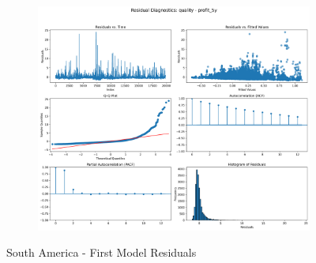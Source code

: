 \documentclass[11pt,english,a4paper,hidelinks]{book}
\begin{document}
\begin{figure}[H]
\begin{subfigure}[b]{0.32\textwidth}
    \end{subfigure}
    \hfill
    \begin{subfigure}[b]{0.32\textwidth}
        \centering
        \includegraphics[width=\textwidth]{images/code/models/linear_regression/first_model/LAT/quality_profit_5y_residuals.png}
    \end{subfigure}
    \caption{South America - First Model Residuals}
    \label{fig:linear_regression_LAT_residues}
\end{figure}
\end{document}
